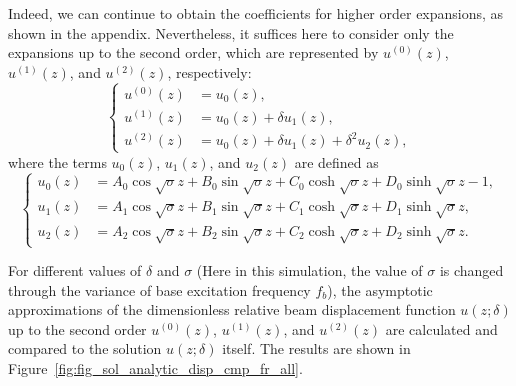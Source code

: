 \documentclass{svjour3}                     %
\begin{document}
Indeed, we can continue to obtain the coefficients for higher order expansions, as shown in the appendix. Nevertheless, it suffices here to consider only the expansions up to the second order, which are represented by $u^{(0)} (z)$, $u^{(1)} (z)$, and $u^{(2)} (z)$, respectively:
\begin{equation}
    \left\{\begin{aligned}
        u^{(0)} (z) &= u_0 (z), \\
        u^{(1)} (z) &= u_0 (z) + \delta u_1(z), \\
        u^{(2)} (z) &= u_0 (z) + \delta u_1(z) + \delta^2 u_2 (z),
    \end{aligned}\right.
\end{equation}
where the terms $u_0 (z)$, $u_1(z)$, and $u_2 (z)$ are defined as
\begin{equation}
    \left\{\begin{aligned}
        u_0 (z) &= A_0 \cos{\sqrt{\sigma}z} + B_0 \sin{\sqrt{\sigma}z} + C_0 \cosh{\sqrt{\sigma}z} + D_0 \sinh{\sqrt{\sigma}z} - 1, \\
        u_1 (z) &= A_1 \cos{\sqrt{\sigma}z} + B_1 \sin{\sqrt{\sigma}z} + C_1 \cosh{\sqrt{\sigma}z} + D_1 \sinh{\sqrt{\sigma}z}, \\
        u_2 (z) &= A_2 \cos{\sqrt{\sigma}z} + B_2 \sin{\sqrt{\sigma}z} + C_2 \cosh{\sqrt{\sigma}z} + D_2 \sinh{\sqrt{\sigma}z}.
    \end{aligned}\right.
\end{equation}

For different values of $\delta$ and $\sigma$ (Here in this simulation, the value of $\sigma$ is changed through the variance of base excitation frequency $f_b$), the asymptotic approximations of the dimensionless relative beam displacement function $u(z;\delta)$ up to the second order $u^{(0)}(z)$, $u^{(1)}(z)$, and $u^{(2)}(z)$ are calculated and compared to the solution $u(z;\delta)$ itself. The results are shown in Figure~\ref{fig:fig_sol_analytic_disp_cmp_fr_all}. 
\end{document}
